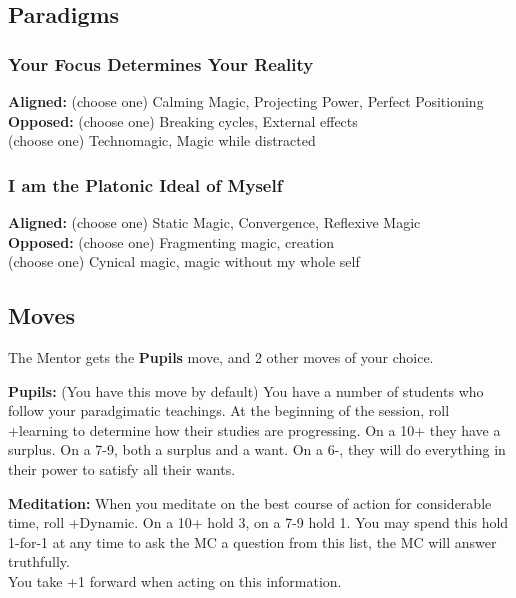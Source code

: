 \documentclass[
  oneside,
  statementpaper,
  9pt]{memoir}
\begin{document}
\hypertarget{paradigms-3}{%
\subsection{Paradigms}\label{paradigms-3}}

\hypertarget{your-focus-determines-your-reality}{%
\subsubsection{Your Focus Determines Your
Reality}\label{your-focus-determines-your-reality}}

\textbf{Aligned:} (choose one) Calming Magic, Projecting Power, Perfect
Positioning\\
\textbf{Opposed:} (choose one) Breaking cycles, External effects\\
(choose one) Technomagic, Magic while distracted

\hypertarget{i-am-the-platonic-ideal-of-myself}{%
\subsubsection{I am the Platonic Ideal of
Myself}\label{i-am-the-platonic-ideal-of-myself}}

\textbf{Aligned:} (choose one) Static Magic, Convergence, Reflexive
Magic\\
\textbf{Opposed:} (choose one) Fragmenting magic, creation\\
(choose one) Cynical magic, magic without my whole self

\hypertarget{moves-3}{%
\subsection{Moves}\label{moves-3}}

The Mentor gets the \textbf{Pupils} move, and 2 other moves of your
choice.

\textbf{Pupils:} (You have this move by default) You have a number of
students who follow your paradgimatic teachings. At the beginning of the
session, roll +learning to determine how their studies are progressing.
On a 10+ they have a surplus. On a 7-9, both a surplus and a want. On a
6-, they will do everything in their power to satisfy all their wants.

\textbf{Meditation:} When you meditate on the best course of action for
considerable time, roll +Dynamic. On a 10+ hold 3, on a 7-9 hold 1. You
may spend this hold 1-for-1 at any time to ask the MC a question from
this list, the MC will answer truthfully.\\
You take +1 forward when acting on this information.
\end{document}
